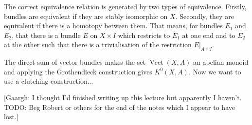 \documentclass[a4paper,10pt]{article}
\theoremstyle{plain}%
\theoremstyle{definition}
\theoremstyle{remark}
\DeclareMathOperator{\Vect}{Vect}
\begin{document}
The correct equivalence relation is generated by two types of
equivalence. Firstly, bundles are equivalent if they are stably
isomorphic on $X$. Secondly, they are equivalent if there is a
homotopy between them. That means, for bundles $E_1$ and $E_2$, that
there is a bundle $E$ on $X\times I$ which restricts to $E_1$ at one
end and to $E_2$ at the other such that there is a trivialisation of
the restriction $E|_{A\times I}$.

The direct sum of vector bundles makes the set $\Vect(X,A)$ an abelian
monoid and applying the Grothendieck construction gives
$K^0(X,A)$. Now we want to use a clutching construction...

[Gaargh: I thought I'd finished writing up this lecture but apparently
I haven't. TODO: Beg Robert or others for the end of the notes which I
appear to have lost.]
\end{document}
